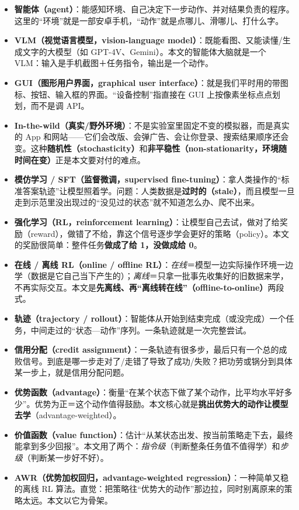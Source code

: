 \documentclass[11pt,UTF8,fontset=fandol]{ctexart}
\begin{document}
\begin{itemize}[leftmargin=1.4em]
\item \textbf{智能体（agent）}：能感知环境、自己决定下一步动作、并对结果负责的程序。这里的“环境”就是一部安卓手机，“动作”就是点哪儿、滑哪儿、打什么字。
\item \textbf{VLM（视觉语言模型，vision-language model）}：既能看图、又能读懂/生成文字的大模型（如 GPT-4V、Gemini）。本文的智能体大脑就是一个 VLM：输入是手机截图＋任务指令，输出是一个动作。
\item \textbf{GUI（图形用户界面，graphical user interface）}：就是我们平时用的带图标、按钮、输入框的界面。“设备控制”指直接在 GUI 上按像素坐标点点划划，而不是调 API。
\item \textbf{In-the-wild（真实/野外环境）}：不是实验室里固定不变的模拟器，而是真实的 App 和网站——它们会改版、会弹广告、会让你登录、搜索结果顺序还会变。这种\textbf{随机性（stochasticity）}和\textbf{非平稳性（non-stationarity，环境随时间在变）}正是本文要对付的难点。
\item \textbf{模仿学习 / SFT（监督微调，supervised fine-tuning）}：拿人类操作的“标准答案轨迹”让模型照着学。问题：人类数据是\textbf{过时的（stale）}，而且模型一旦走到示范里没出现过的“没见过的状态”就不知道怎么办、爬不出来。
\item \textbf{强化学习（RL，reinforcement learning）}：让模型自己去试，做对了给奖励（reward），做错了不给，靠这个信号逐步学会更好的策略（policy）。本文的奖励很简单：整件任务\textbf{做成了给 1，没做成给 0}。
\item \textbf{在线 / 离线 RL（online / offline RL）}：\emph{在线}＝模型一边实际操作环境一边学（数据是它自己当下产生的）；\emph{离线}＝只拿一批事先收集好的旧数据来学，不再实际交互。本文是\textbf{先离线、再“离线转在线”（offline-to-online）}两段式。
\item \textbf{轨迹（trajectory / rollout）}：智能体从开始到结束完成（或没完成）一个任务，中间走过的“状态—动作”序列。一条轨迹就是一次完整尝试。
\item \textbf{信用分配（credit assignment）}：一条轨迹有很多步，最后只有一个总的成败信号。到底是哪一步走对了/走错了导致了成功/失败？把功劳或锅分到具体某一步上，就是信用分配问题。
\item \textbf{优势函数（advantage）}：衡量“在某个状态下做了某个动作，比平均水平好多少”。优势为正＝这个动作值得鼓励。本文核心就是\textbf{挑出优势大的动作让模型去学}（advantage-weighted）。
\item \textbf{价值函数（value function）}：估计“从某状态出发、按当前策略走下去，最终能拿到多少回报”。本文用了两个：\emph{指令级}（判断整条任务值不值得学）和\emph{步级}（判断某一步好不好）。
\item \textbf{AWR（优势加权回归，advantage-weighted regression）}：一种简单又稳的离线 RL 算法。直觉：把策略往“优势大的动作”那边拉，同时别离原来的策略太远。本文以它为骨架。
\end{itemize}
\end{document}
